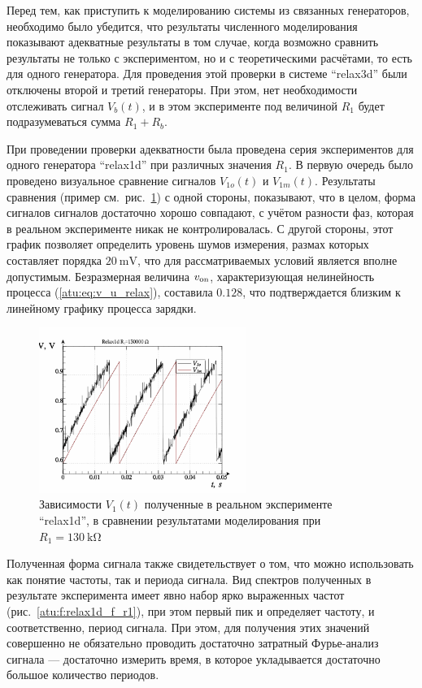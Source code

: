 Перед тем, как приступить к моделированию системы из связанных генераторов,
необходимо было убедится, что результаты численного моделирования
показывают адекватные результаты в том случае,
когда возможно сравнить результаты не только с экспериментом,
но и с теоретическими расчётами, то есть для одного генератора.
Для проведения этой проверки в системе ``relax3d''
были отключены второй и третий генераторы. При этом, нет необходимости
отслеживать сигнал $V_b(t)$, и в этом эксперименте под величиной
$R_1$ будет подразумеваться сумма $R_1 + R_b$.

При проведении проверки адекватности была проведена серия экспериментов для
одного генератора ``relax1d''
при различных значения $R_1$. В первую очередь было проведено визуальное сравнение
сигналов $V_{1o}(t)$ и $V_{1m}(t)$. Результаты сравнения (пример см.~рис.~\ref{atu:f:relax1d_read_cmp-p_t_r1})
с одной стороны, показывают, что в целом, форма сигналов сигналов достаточно хорошо совпадают,
с учётом разности фаз, которая в реальном эксперименте никак не контролировалась. С другой стороны,
этот график позволяет определить уровень шумов измерения, размах которых
составляет порядка $\SI{20}{\milli\volt}$, что для рассматриваемых условий
является вполне допустимым. Безразмерная величина $v_\mathrm{on}$,
характеризующая нелинейность процесса (\ref{atu:eq:v_u_relax}),
составила $0.128$, что подтверждается близким к линейному графику процесса зарядки.



\begin{figure}[htb!]
  \centerline{\includegraphics[width=0.6\textwidth]{p/relax1d_read_cmp-p_t_r1=130k.png} }
  \caption{Зависимости $V_1(t)$ полученные в реальном эксперименте ``relax1d'', в сравнении результатами моделирования при $R_1=\SI{130}{\kilo\ohm}$ }
  \label{atu:f:relax1d_read_cmp-p_t_r1}
\end{figure}

Полученная форма сигнала также свидетельствует о том, что можно использовать
как понятие частоты, так и периода сигнала. Вид спектров полученных в результате
эксперимента имеет явно набор ярко выраженных частот (рис.~\ref{atu:f:relax1d_f_r1}),
при этом первый пик и определяет частоту, и соответственно, период сигнала.
При этом, для получения этих значений совершенно не обязательно
проводить достаточно затратный Фурье-анализ сигнала --- достаточно
измерить время, в которое укладывается достаточно большое количество периодов.

